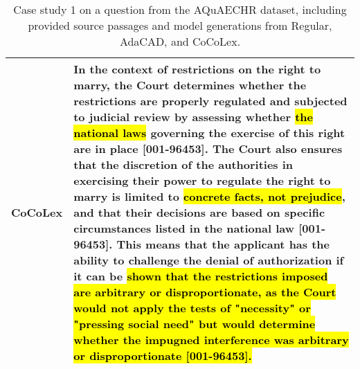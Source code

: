 \begin{table*}[h]
{\begin{tabular}{p{1.5cm}p{18cm}}
    CoCoLex & In the context of restrictions on the right to marry, the Court determines whether the restrictions are properly regulated and subjected to judicial review by assessing whether \hl{the national laws} governing the exercise of this right are in place [001-96453]. The Court also ensures that the discretion of the authorities in exercising their power to regulate the right to marry is limited to \hl{concrete facts, not prejudice}, and that their decisions are based on specific circumstances listed in the national law [001-96453]. This means that the applicant has the ability to challenge the denial of authorization if it can be \hl{shown that the restrictions imposed are arbitrary or disproportionate, as the Court would not apply the tests of "necessity" or "pressing social need" but would determine whether the impugned interference was arbitrary or disproportionate [001-96453].}
     \\ \bottomrule \bottomrule
    \end{tabular}}
    \caption{Case study 1 on a question from the AQuAECHR dataset, including provided source passages and model generations from Regular, AdaCAD, and CoCoLex.}
    \label{tab_case1}
    \end{table*}
    
